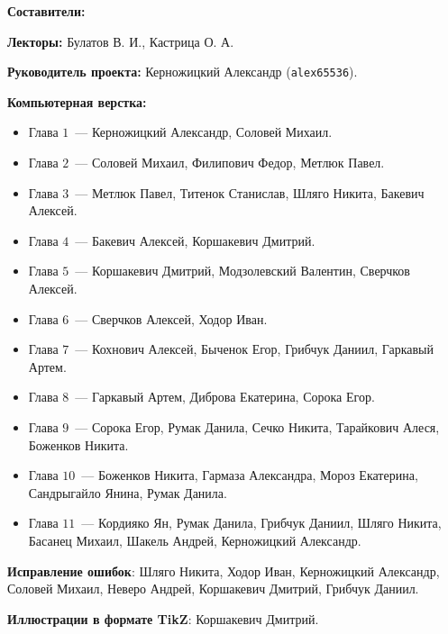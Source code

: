 \documentclass[../main.tex]{subfiles}
\begin{document}
{\Huge \bf Составители:}

\vspace{2em}

{
    \textbf{Лекторы:} Булатов В. И., Кастрица О. А.
    
    \smallskip
    
    \textbf{Руководитель проекта:} Керножицкий Александр 
    (\texttt{alex65536}).
    
    \smallskip
    
    \textbf{Компьютерная верстка:}
    \begin{itemize}
     \item Глава $1$~--- Керножицкий Александр, Соловей Михаил.
     \item Глава $2$~--- Соловей Михаил, Филипович Федор, Метлюк 
     Павел.
     \item Глава $3$~--- Метлюк Павел, Титенок Станислав, Шляго 
     Никита, Бакевич Алексей.
     \item Глава $4$~--- Бакевич Алексей, Коршакевич Дмитрий.
     \item Глава $5$~--- Коршакевич Дмитрий, Модзолевский 
     Валентин, Сверчков Алексей.
     \item Глава $6$~--- Сверчков Алексей, Ходор Иван.
     \item Глава $7$~--- Кохнович Алексей, Быченок Егор, Грибчук Даниил,
     Гаркавый Артем.
     \item Глава $8$~--- Гаркавый Артем, Диброва Екатерина, Сорока Егор.
     \item Глава $9$~--- Сорока Егор, Румак Данила, Сечко Никита, Тарайкович 
     Алеся, Боженков Никита.
     \item Глава $10$~--- Боженков Никита, Гармаза Александра, Мороз
     Екатерина, Сандрыгайло Янина, Румак Данила.
     \item Глава $11$~--- Кордияко Ян, Румак Данила, Грибчук Даниил, Шляго
     Никита, Басанец Михаил, Шакель Андрей, Керножицкий Александр.
    \end{itemize}
    
    \textbf{Исправление ошибок}: Шляго Никита, Ходор Иван,
    Керножицкий Александр, Соловей Михаил, Неверо Андрей, Коршакевич Дмитрий,
    Грибчук Даниил.
    
    \smallskip
    
    \textbf{Иллюстрации в формате TikZ}: Коршакевич Дмитрий.
    
    
}
\end{document}

